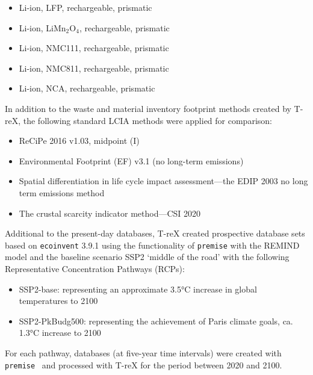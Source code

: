 \documentclass[a4paper,fleqn]{cas-dc}
\begin{document}
\begin{itemize}
	\item Li-ion, LFP, rechargeable, prismatic
	\item Li-ion, LiMn\(_2\)O\(_4\), rechargeable, prismatic
	\item Li-ion, NMC111, rechargeable, prismatic
	\item Li-ion, NMC811, rechargeable, prismatic
	\item Li-ion, NCA, rechargeable, prismatic
\end{itemize}

In addition to the waste and material inventory footprint methods created by
T-reX, the following standard LCIA methods were applied for comparison:

\begin{itemize}
	\item ReCiPe 2016 v1.03, midpoint (I)~\citep{huijbregts2016recipe}
	\item Environmental Footprint (EF) v3.1 (no long-term emissions)~\citep{eu2023ef}
	\item Spatial differentiation in life cycle impact assessment---the EDIP 2003 no long
	      term emissions method~\citep{hauschild2003edip}
	\item The crustal scarcity indicator method---CSI 2020~\citep{arvidsson2020csi}
\end{itemize}

Additional to the present-day databases, T-reX created prospective database
sets based on \texttt{ecoinvent} 3.9.1 using the functionality of
\texttt{premise} with the REMIND model and the baseline scenario SSP2 `middle
of the road' with the following Representative Concentration Pathways (RCPs):
\begin{itemize}
	\item SSP2-base: representing an approximate 3.5°C increase in global temperatures to
	      2100
	\item SSP2-PkBudg500: representing the achievement of Paris climate goals, ca. 1.3°C
	      increase to 2100
\end{itemize}

For each pathway, databases (at five-year time intervals) were created with
\texttt{premise}~\citep{sacchi2022premise} and processed with T-reX for the
period between 2020 and 2100.
\end{document}
